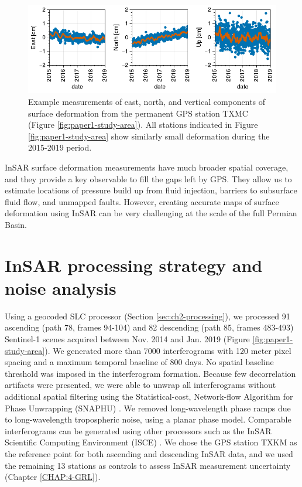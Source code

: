 \begin{figure}
	\centering
	\includegraphics[width=0.99\linewidth]{figures/chapter3-permian/gps-txmc.pdf}
	\caption[Example permanent GPS station measurements]{
		Example measurements of east, north, and vertical components of surface deformation from the permanent GPS station TXMC (Figure \ref{fig:paper1-study-area}). All stations indicated in Figure \ref{fig:paper1-study-area} show similarly small deformation during the 2015-2019 period.
	}
	\label{fig:ch3-gps}
\end{figure}

InSAR surface deformation measurements have much broader spatial coverage, and they provide a key observable to fill the gaps left by GPS. They allow us to estimate locations of pressure build up from fluid injection, barriers to subsurface fluid flow, and unmapped faults. However, creating accurate maps of surface deformation using InSAR can be very challenging at the scale of the full Permian Basin.


\FloatBarrier

\section{InSAR processing strategy and noise analysis}
\label{sec:ch3-insar-processing}

Using a geocoded SLC processor \citep{Zheng2017PhaseCorrectionSingle, Zebker2017UserFriendlyInsar} (Section \ref{sec:ch2-processing}), we processed 91 ascending (path 78, frames 94-104) and 82 descending (path 85, frames 483-493) Sentinel-1 scenes acquired between Nov. 2014 and Jan. 2019 (Figure \ref{fig:paper1-study-area}). We generated more than 7000 interferograms with 120 meter pixel spacing and a maximum temporal baseline of 800 days. No spatial baseline threshold was imposed in the interferogram formation. Because few decorrelation artifacts were presented, we were able to unwrap all interferograms without additional spatial filtering using the Statistical-cost, Network-flow Algorithm for Phase Unwrapping (SNAPHU) \citep{Chen2001TwoDimensionalPhase}. We removed long-wavelength phase ramps due to long-wavelength tropospheric noise, using a planar phase model. Comparable interferograms can be generated using other processors such as the InSAR Scientific Computing Environment (ISCE) \citep{Rosen2012InsarScientificComputing}. 
We chose the GPS station TXKM as the reference point for both ascending and descending InSAR data, and we used the remaining 13 stations as controls to assess InSAR measurement uncertainty (Chapter \ref{CHAP:4-GRL}).

